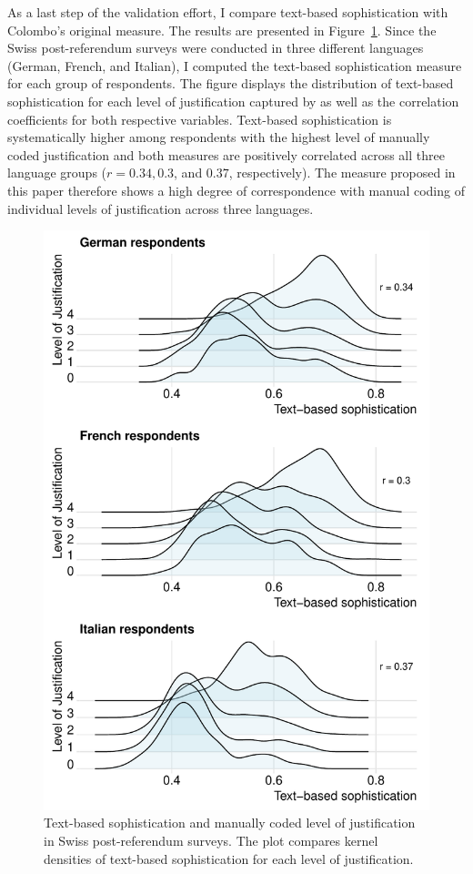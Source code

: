 \documentclass[12pt]{article}
\begin{document}
As a last step of the validation effort, I compare text-based sophistication with Colombo's \citeyearpar{colombo2016justifications} original measure. The results are presented in Figure~\ref{fig:swiss_ggjoy}. Since the Swiss post-referendum surveys were conducted in three different languages (German, French, and Italian), I computed the text-based sophistication measure for each group of respondents. The figure displays the distribution of text-based sophistication for each level of justification captured by \citet{colombo2016justifications} as well as the correlation coefficients for both respective variables. Text-based sophistication is systematically higher among respondents with the highest level of manually coded justification and both measures are positively correlated across all three language groups ($r=0.34, 0.3$, and $0.37$, respectively). The measure proposed in this paper therefore shows a high degree of correspondence with manual coding of individual levels of justification across three languages.


\begin{figure}[h]\centering
\includegraphics[scale=.6]{../fig/ggjoy.pdf}
\caption{Text-based sophistication and manually coded level of justification \citep{colombo2016justifications} in Swiss post-referendum surveys. The plot compares kernel densities of text-based sophistication for each level of justification.}\label{fig:swiss_ggjoy}
\end{figure}
\end{document}

